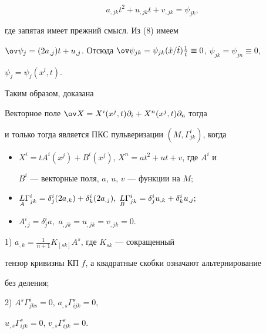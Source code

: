 $$ 


a_{,jk}t^2+u_{,jk}t+v_{,jk}=\psi_{jk}, 


$$ 


где запятая имеет прежний смысл. Из (8) имеем 


$\ov\psi_j=(2a_{,j})t+u_{,j}$. Отсюда $\ov\psi_{jk}=\psi_{jk}(\Dot 


x/\Dot t)\frac{1}{\Dot t}\equiv0$, $\psi_{jk}=\psi_{j n}\equiv0$, 


$\psi_j=\psi_j(x^l,t)$. 


 


Таким образом, доказана 


 


\begin{thm} 


Векторное поле $\ov X=X^i(x^j,t)\partial_i+X^n(x^j,t)\partial_n$ тогда 


и только тогда является ПКС пульверизации $(M,\Gamma^i_{jk})$, когда 


\begin{itemize} 


\item[1.] $X^i=t A^i(x^j)+B^i(x^j)$, $X^n=at^2+u t+v$, где $A^i$ и 


$B^i$ --- векторные поля, $a$, $u$, $v$ --- функции на $M;$ 


\item[2.] $\down{A}{L}\Gamma^i_{jk}=\delta^i_j(2a_{,k})+ 


\delta^i_k(2a_{,j}),$ $\down{B}{L}\Gamma^i_{jk}=\delta^i_j u_{,k}+ 


\delta^i_k u_{,j};$ 


\item[3.] $A^i_{,j}=\delta^i_j a,$ $a_{,jk}=u_{,jk}=v_{,jk}=0$. 


\end{itemize} 


\end{thm} 


 


\begin{cor} 


1) $a_{,k}=\frac{1}{n+1}K_{[s k]}A^s$, где $K_{s k}$ --- сокращенный 


тензор кривизны КП $f$, а квадратные скобки означают альтернирование 


без деления;


 


2) $A^s\Gamma^i_{jk s}=0$, $a_{,s}\Gamma^s_{i jk}=0$, 


$u_{,s}\Gamma^s_{i jk}=0$, $v_{,s}\Gamma^s_{i jk}=0$. 


\end{cor} 


